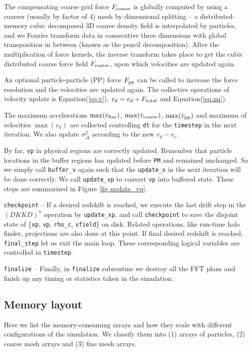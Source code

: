 \documentclass[10pt,twocolumn,preprint]{emulateapj}
\begin{document}
The compensating coarse grid force $F_{\rm coarse}$ is globally computed by using a coarser (usually by factor of 4) mesh by dimensional splitting -- a distributed-memory cubic decomposed 3D coarse density field is interpolated by particles, and we Fourier transform data in consecutive three dimensions with global transposition in between (known as the pencil decomposition). After the multiplication of force kernels, the inverse transform takes place to get the cubic distributed coarse force field $F_{\rm coarse}$, upon which velocities are updated again.

An optional particle-particle (PP) force $F_{\rm pp}$ can be called to increase the force resolution and the velocities are updated again. The collective operations of velocity update is Equation(\ref{eq.v}), $v_d=v_d+F_{\rm total}$ and Equation(\ref{eq.nu}).

The maximum accelerations $\max(\dot{v}_{\rm fine})$, $\max(\dot{v}_{\rm coarse})$, $\max(\dot{v}_{\rm pp})$ and maximum of velocities $\max(v_d)$ are collected controlling {\tt dt} for the {\tt timestep} in the next iteration. We also update $\sigma^2_{\Delta}$ according to the new $v_d-v_c$.

By far, {\tt vp} in physical regions are correctly updated. Remember that particle locations in the buffer regions has updated before {\tt PM} and remained unchanged. So we simply call {\tt buffer\_v} again such that the {\tt update\_x} in the next iteration will be done correctly. We call {\tt update\_vp} to convert {\tt vp} into buffered state. These steps are summarized in Figure \ref{fig.update_vp}.

{\tt checkpoint} -- 
If a desired redshift is reached, we execute the last drift step in the $(DKKD)^n$ operation by {\tt update\_xp}, and call {\tt checkpoint} to save the disjoint state of \{{\tt xp}, {\tt vp}, {\tt rho\_c}, {\tt vfield}\} on disk. Related operations, like run-time halo finder, projections are also done at this point. If final desired redshift is reached, {\tt final\_step} let us exit the main loop. These corresponding logical variables are controlled in {\tt timestep}.

{\tt finalize} --
Finally, in {\tt finalize} subroutine we destroy all the FFT plans and finish up any timing or statistics taken in the simulation.

\subsection{Memory layout}\label{ss.memory}
Here we list the memory-consuming arrays and how they scale with different configurations of the simulation. We classify them into (1) arrays of particles, (2) coarse mesh arrays and (3) fine mesh arrays.
\end{document}
